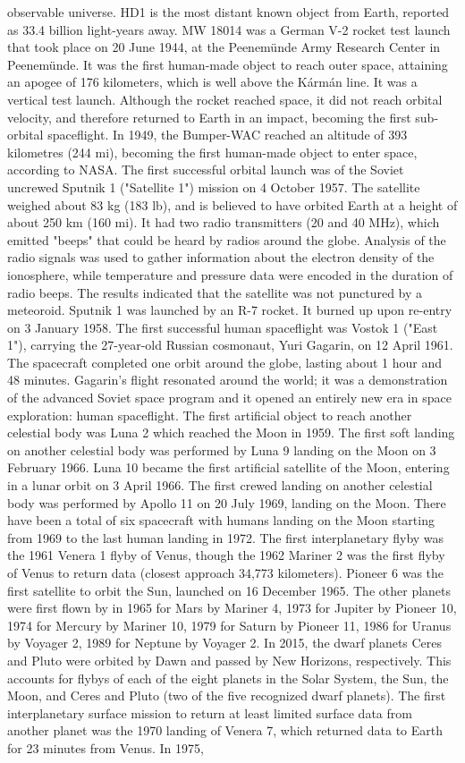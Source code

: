 \documentclass[12pt]{article}
\begin{document}
observable universe. HD1 is the most distant known object from Earth, reported as 33.4 billion light-years away. MW 18014 was a German V-2 rocket test launch that took place on 20 June 1944, at the Peenemünde Army Research Center in Peenemünde. It was the first human-made object to reach outer space, attaining an apogee of 176 kilometers, which is well above the Kármán line. It was a vertical test launch. Although the rocket reached space, it did not reach orbital velocity, and therefore returned to Earth in an impact, becoming the first sub-orbital spaceflight. In 1949, the Bumper-WAC reached an altitude of 393 kilometres (244 mi), becoming the first human-made object to enter space, according to NASA. The first successful orbital launch was of the Soviet uncrewed Sputnik 1 ("Satellite 1") mission on 4 October 1957. The satellite weighed about 83 kg (183 lb), and is believed to have orbited Earth at a height of about 250 km (160 mi). It had two radio transmitters (20 and 40 MHz), which emitted "beeps" that could be heard by radios around the globe. Analysis of the radio signals was used to gather information about the electron density of the ionosphere, while temperature and pressure data were encoded in the duration of radio beeps. The results indicated that the satellite was not punctured by a meteoroid. Sputnik 1 was launched by an R-7 rocket. It burned up upon re-entry on 3 January 1958. The first successful human spaceflight was Vostok 1 ("East 1"), carrying the 27-year-old Russian cosmonaut, Yuri Gagarin, on 12 April 1961. The spacecraft completed one orbit around the globe, lasting about 1 hour and 48 minutes. Gagarin's flight resonated around the world; it was a demonstration of the advanced Soviet space program and it opened an entirely new era in space exploration: human spaceflight. The first artificial object to reach another celestial body was Luna 2 which reached the Moon in 1959. The first soft landing on another celestial body was performed by Luna 9 landing on the Moon on 3 February 1966. Luna 10 became the first artificial satellite of the Moon, entering in a lunar orbit on 3 April 1966. The first crewed landing on another celestial body was performed by Apollo 11 on 20 July 1969, landing on the Moon. There have been a total of six spacecraft with humans landing on the Moon starting from 1969 to the last human landing in 1972. The first interplanetary flyby was the 1961 Venera 1 flyby of Venus, though the 1962 Mariner 2 was the first flyby of Venus to return data (closest approach 34,773 kilometers). Pioneer 6 was the first satellite to orbit the Sun, launched on 16 December 1965. The other planets were first flown by in 1965 for Mars by Mariner 4, 1973 for Jupiter by Pioneer 10, 1974 for Mercury by Mariner 10, 1979 for Saturn by Pioneer 11, 1986 for Uranus by Voyager 2, 1989 for Neptune by Voyager 2. In 2015, the dwarf planets Ceres and Pluto were orbited by Dawn and passed by New Horizons, respectively. This accounts for flybys of each of the eight planets in the Solar System, the Sun, the Moon, and Ceres and Pluto (two of the five recognized dwarf planets). The first interplanetary surface mission to return at least limited surface data from another planet was the 1970 landing of Venera 7, which returned data to Earth for 23 minutes from Venus. In 1975, 
\end{document}
